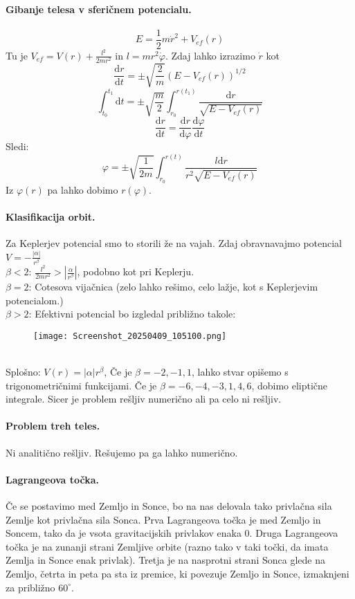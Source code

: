 \documentclass[a4paper]{article}
\newcommand{\dif}{\mathrm{d}}
\newcommand{\dd}[2]{\frac{\mathrm{d} {#1}}{\mathrm{d} {#2}}}
\begin{document}
\paragraph{Gibanje telesa v sferičnem potencialu.} $$E = \frac{1}{2}m\dot{r}^2 + V_{ef}(r)$$
Tu je $\displaystyle{V_{ef} = V(r) + \frac{l^2}{2mr^2}}$ in $l = mr^2\dot{\varphi}$. Zdaj lahko izrazimo $\dot{r}$ kot
$$\dd{r}{t}=\pm\sqrt{\frac{2}{m}}\left(E - V_{ef}(r)\right)^{1/2}$$
$$\int_{t_0}^{t_1}\dif t = \pm\sqrt{\frac{m}{2}}\int_{r_0}^{r(t_1)}\frac{\dif r}{\sqrt{E - V_{ef}(r)}}$$
$$\dd{r}{t} = \dd{r}{\varphi}\dd{\varphi}{t}$$
Sledi:
$$\varphi = \pm \sqrt{\frac{1}{2m}} \int_{r_0}^{r(t)} \frac{l\dif r}{r^2\sqrt{E - V_{ef}(r)}}$$
Iz $\varphi(r)$ pa lahko dobimo $r(\varphi)$.
\paragraph{Klasifikacija orbit.} Za Keplerjev potencial smo to storili že na vajah. Zdaj obravnavajmo potencial $\displaystyle{V = -\frac{|\alpha|}{r^\beta}}$ \\[2mm]
$\beta < 2$: $\displaystyle{\frac{l^2}{2mr^2} > \left|\frac{\alpha}{r^\beta}\right|}$, podobno kot pri Keplerju. \\[2mm]
$\beta = 2$: Cotesova vijačnica (zelo lahko rešimo, celo lažje, kot s Keplerjevim potencialom.) \\[2mm]
$\beta > 2$: Efektivni potencial bo izgledal približno takole:
\begin{figure}[h!]
    \texttt{[image: Screenshot\_20250409\_105100.png]}
\end{figure}
\\[2mm]
Splošno: $V(r) = |\alpha|r^\beta$,
Če je $\beta = -2, -1, 1$, lahko stvar opišemo s trigonometričnimi funkcijami. Če je $\beta = -6, -4, -3, 1, 4, 6$, dobimo eliptične integrale. Sicer je problem rešljiv numerično ali pa celo ni rešljiv.
\paragraph{Problem treh teles.} Ni analitično rešljiv. Rešujemo pa ga lahko numerično.
\paragraph{Lagrangeova točka.} Če se postavimo med Zemljo in Sonce, bo na nas delovala tako privlačna sila Zemlje kot privlačna sila Sonca. Prva Lagrangeova točka je med Zemljo in Soncem, tako da je vsota gravitacijskih privlakov enaka 0. Druga Lagrangeova točka je na zunanji strani Zemljive orbite (razno tako v taki točki, da imata Zemlja in Sonce enak privlak).
Tretja je na nasprotni strani Sonca glede na Zemljo, četrta in peta pa sta iz premice, ki povezuje Zemljo in Sonce, izmaknjeni za približno $60^\circ$.
\end{document}

